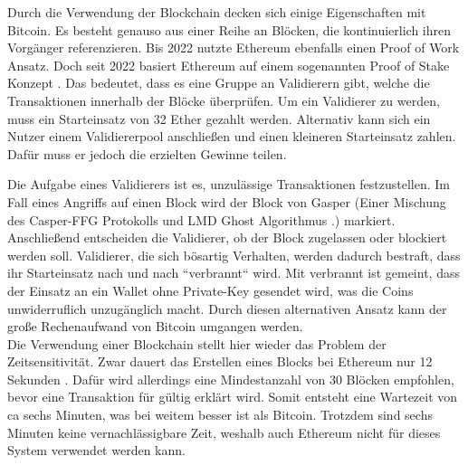 \documentclass[
	fontsize=12pt,
	headings=small,
	parskip=half,           %
	bibliography=totoc,
	numbers=noenddot,       %
	open=any,               %
]{scrreprt}
\begin{document}
Durch die Verwendung der Blockchain decken sich einige Eigenschaften mit Bitcoin. Es besteht genauso aus einer Reihe an Blöcken, die kontinuierlich ihren Vorgänger referenzieren. Bis 2022 nutzte Ethereum ebenfalls einen Proof of Work Ansatz. Doch seit 2022 basiert Ethereum auf einem sogenannten Proof of Stake Konzept \cite{eth-explainerInvestopia}. Das bedeutet, dass es eine Gruppe an Validierern gibt, welche die Transaktionen innerhalb der Blöcke überprüfen. Um ein Validierer zu werden, muss ein Starteinsatz von 32 Ether gezahlt werden. Alternativ kann sich ein Nutzer einem Validiererpool anschließen und einen kleineren Starteinsatz zahlen. Dafür muss er jedoch die erzielten Gewinne teilen. 

Die Aufgabe eines Validierers ist es, unzulässige Transaktionen festzustellen. Im Fall eines Angriffs auf einen Block wird der Block von Gasper (Einer Mischung des Casper-FFG Protokolls und LMD Ghost Algorithmus \cite{eth-buterin2020combining}.) markiert. Anschließend entscheiden die Validierer, ob der Block zugelassen oder blockiert werden soll. Validierer, die sich bösartig Verhalten, werden dadurch bestraft, dass ihr Starteinsatz nach und nach ``verbrannt`` wird. Mit verbrannt ist gemeint, dass der Einsatz an ein Wallet ohne Private-Key gesendet wird, was die Coins unwiderruflich unzugänglich macht. Durch diesen alternativen Ansatz kann der große Rechenaufwand von Bitcoin umgangen werden.\\

Die Verwendung einer Blockchain stellt hier wieder das Problem der Zeitsensitivität. Zwar dauert das Erstellen eines Blocks bei Ethereum nur 12 Sekunden \cite{eth-timePerBlock}. Dafür wird allerdings eine Mindestanzahl von 30 Blöcken empfohlen, bevor eine Transaktion für gültig erklärt wird. Somit entsteht eine Wartezeit von ca sechs Minuten, was bei weitem besser ist als Bitcoin. Trotzdem sind sechs Minuten keine vernachlässigbare Zeit, weshalb auch Ethereum nicht für dieses System verwendet werden kann.
\end{document}
